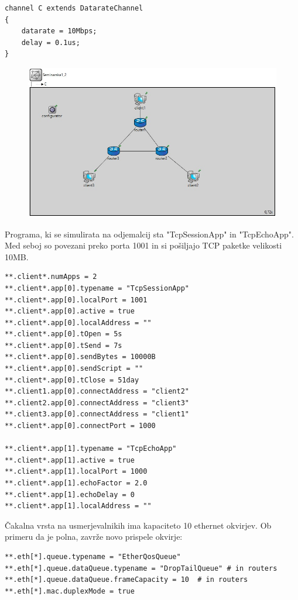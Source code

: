\documentclass[11pt,a4paper,slovene]{myarticle}
\begin{document}
\begin{lstlisting}
channel C extends DatarateChannel
{
    datarate = 10Mbps;
    delay = 0.1us;
}
\end{lstlisting}

\begin{figure}[h]
  \includegraphics[width=\linewidth]{omrezje2.jpg}
\end{figure}

Programa, ki se simulirata na odjemalcij sta "TcpSessionApp" in "TcpEchoApp". Med seboj so povezani preko porta 1001 in si pošiljajo TCP paketke velikosti 10MB.

\begin{lstlisting}[h]
**.client*.numApps = 2
**.client*.app[0].typename = "TcpSessionApp"
**.client*.app[0].localPort = 1001
**.client*.app[0].active = true
**.client*.app[0].localAddress = ""
**.client*.app[0].tOpen = 5s
**.client*.app[0].tSend = 7s
**.client*.app[0].sendBytes = 10000B
**.client*.app[0].sendScript = ""
**.client*.app[0].tClose = 51day
**.client1.app[0].connectAddress = "client2"
**.client2.app[0].connectAddress = "client3"
**.client3.app[0].connectAddress = "client1"
**.client*.app[0].connectPort = 1000

**.client*.app[1].typename = "TcpEchoApp"
**.client*.app[1].active = true
**.client*.app[1].localPort = 1000
**.client*.app[1].echoFactor = 2.0
**.client*.app[1].echoDelay = 0
**.client*.app[1].localAddress = ""
\end{lstlisting}

Čakalna vrsta na usmerjevalnikih ima kapaciteto 10 ethernet okvirjev. Ob primeru da je polna, zavrže novo prispele okvirje:
\begin{lstlisting}[h]
**.eth[*].queue.typename = "EtherQosQueue"
**.eth[*].queue.dataQueue.typename = "DropTailQueue" # in routers
**.eth[*].queue.dataQueue.frameCapacity = 10  # in routers
**.eth[*].mac.duplexMode = true
\end{lstlisting}
\end{document}
